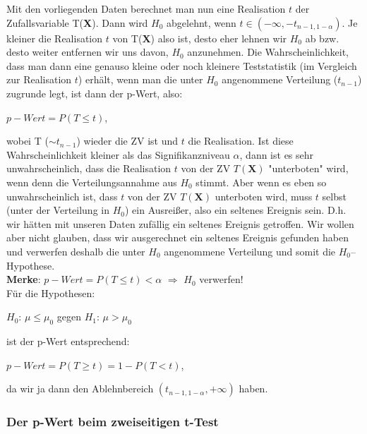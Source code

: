\documentclass[a4paper]{article}
\newcommand\dangersign[1][2ex]{%
  \renewcommand\stacktype{L}%
  \scaleto{\stackon[1.3pt]{\color{red}$\triangle$}{\tiny !}}{#1}%
}
\begin{document}
\noindent Mit den vorliegenden Daten berechnet man nun eine Realisation $t$ der Zufallsvariable T(\textbf{X}). Dann wird $H_0$ abgelehnt, wenn $t \in (-\infty, -t_{n-1,1-\alpha})$. Je kleiner die Realisation $t$ von T(\textbf{X}) also ist, desto eher lehnen wir $H_0$ ab bzw. desto weiter entfernen wir uns davon, $H_0$ anzunehmen. Die Wahrscheinlichkeit, dass man dann eine genauso kleine oder noch kleinere Teststatistik (im Vergleich zur Realisation $t$) erhält, wenn man die unter $H_0$ angenommene Verteilung ($t_{n-1}$) zugrunde legt, ist dann der p-Wert, also:

\begin{center} $p-Wert=P(T \leq t)$, \end{center} 
wobei T ($\sim t_{n-1}$) wieder die ZV ist und $t$ die Realisation. Ist diese Wahrscheinlichkeit kleiner als das Signifikanzniveau $\alpha$, dann ist es sehr unwahrscheinlich, dass die Realisation $t$ von der ZV $T(\textbf{X})$ "unterboten" wird, wenn denn die Verteilungsannahme aus $H_0$ stimmt. Aber wenn es eben so unwahrscheinlich ist, dass $t$ von der ZV $T(\textbf{X})$ unterboten wird, muss $t$ selbst (unter der Verteilung in $H_0$) ein Ausreißer, also ein seltenes Ereignis sein. D.h. wir hätten mit unseren Daten zufällig ein seltenes Ereignis getroffen. Wir wollen aber nicht glauben, dass wir ausgerechnet ein seltenes Ereignis gefunden haben und verwerfen deshalb die unter $H_0$ angenommene Verteilung und somit die $H_0$--Hypothese. \\

\textbf{Merke}: $p-Wert=P(T \leq t) < \alpha$ $\Rightarrow$ $H_0$ verwerfen! \\[1.5cm]

\noindent \dangersign[3ex] Für die Hypothesen: \\
\begin{center} $H_0$: $\mu \leq \mu_0$ \hspace{2cm }gegen \hspace{2cm } $H_1$: $\mu > \mu_0$ \end{center}
ist der p-Wert entsprechend:
\begin{center} $p-Wert=P(T \geq t)=1-P(T < t)$, \end{center} 
da wir ja dann den Ablehnbereich $(t_{n-1,1-\alpha}, + \infty)$ haben.

\subsubsection{Der p-Wert beim zweiseitigen t-Test}\label{sec:pWert2}
\end{document}
